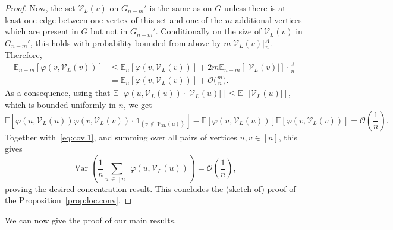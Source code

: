 \documentclass[10pt]{amsart}
\theoremstyle{definition}\newtheorem{defi}[theo]{Definition}\newtheorem{rema}[theo]{Remark}\newtheorem{exam}[theo]{Example}\newtheorem{exem}[theo]{Example}\newtheorem{nota}[theo]{Notation}
\newcommand{\bbE}{\mathbb{E}}
\newcommand{\cV}{\mathcal{V}}
\newcommand{\cO}{\mathcal{O}}
\DeclareMathOperator{\rVar}{Var}
\begin{document}
\begin{proof}
Now, the set $\cV_L(v)$ on $G_{n-m}'$ is the same as on $G$ unless there is at least one edge between one vertex of this set and one of the $m$ additional vertices which are present in $G$ but not in $G_{n-m}'$. Conditionally on the size of $\cV_L(v)$ in $G_{n-m}'$, this holds with probability bounded from above by $m|\cV_L(v)|\tfrac{\Lambda}{n}$. Therefore,
\begin{align*}
\bbE_{n-m}[\varphi(v,\cV_L(v))] &\le
\bbE_n[\varphi(v,\cV_L(v))] + 2 m\bbE_{n-m}[|\cV_L(v)|] \cdot \tfrac{\Lambda}{n}\\
&=\bbE_n[\varphi(v,\cV_L(v))] + \cO\bigg(\frac mn\bigg).
\end{align*}
As a consequence, using that $\bbE[\varphi(u, \cV_L(u))\cdot |\cV_L(u)|]\le \bbE[|\cV_L(u)|]$, which is bounded uniformly in $n$, we get
\[
\bbE\left[\varphi(u,\cV_L(u)) \varphi(v,\cV_L(v))\cdot
\mathds{1}_{\left\{ v\,\notin\,\cV_{2L}(u)\right\}}\right] - \bbE\left[\varphi(u,\cV_L(u))\right] \bbE\left[\varphi(v,\cV_L(v))\right] = \cO\left(\frac 1n\right).
\]
Together with~\eqref{eq:cov.1}, and summing over all pairs of vertices $u,v\in [n]$, this gives
\[
\rVar\left(\frac 1n \sum_{u\,\in\,[n]} \varphi(u,\cV_L(u))\right) = \cO\left(\frac 1n\right),
\]
proving the desired concentration result. This concludes the (sketch of) proof of the Proposition~\ref{prop:loc.conv}.
\end{proof}

We can now give the proof of our main results.
\end{document}
